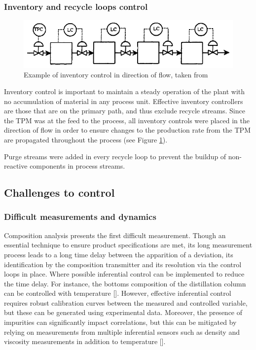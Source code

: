 \subsubsection{Inventory and recycle loops control} %
    \begin{figure}
        \centering
        \includegraphics[width=\linewidth]{chapters/4-operation-control/4-Figures/TPM-Price-1994.png}
        \caption{Example of inventory control in direction of flow, taken from \textcite{}}
        \label{fig:TPM}
    \end{figure}
Inventory control is important to maintain a steady operation of the plant with no accumulation of material in any process unit. Effective inventory controllers are those that are on the primary path, and thus exclude recycle streams. Since the TPM was at the feed to the process, all inventory controls were placed in the direction of flow in order to ensure changes to the production rate from the TPM are propagated throughout the process (see Figure \ref{fig:TPM}). 

Purge streams were added in every recycle loop to prevent the buildup of non-reactive components in process streams.  


\subsection{Challenges to control}%

\subsubsection{Difficult measurements and dynamics} %
Composition analysis presents the first difficult measurement. Though an essential technique to ensure product specifications are met, its long measurement process leads to a long time delay between the apparition of a deviation, its identification by the composition transmitter and its resolution via the control loops in place. Where possible inferential control can be implemented to reduce the time delay. For instance, the bottoms composition of the distillation column can be controlled with temperature []. However, effective inferential control requires robust calibration curves between the measured and controlled variable, but these can be generated using experimental data. Moreover, the presence of impurities can significantly impact correlations, but this can be mitigated by relying on measurements from multiple inferential sensors such as density and viscosity measurements in addition to temperature [].

